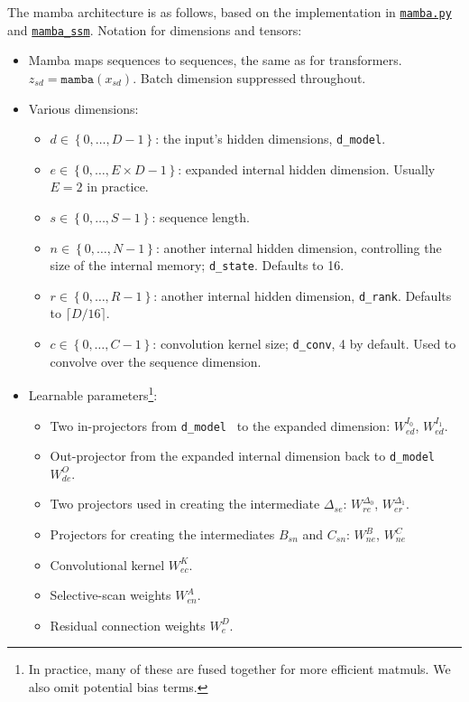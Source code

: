 The mamba architecture is as follows, based on the implementation in
\href{https://github.com/alxndrTL/mamba.py}{\texttt{mamba.py}} and
\href{https://github.com/state-spaces/mamba}{\texttt{mamba\_ssm}}.  Notation for dimensions and
tensors:
\begin{itemize}
    \item Mamba maps sequences to sequences, the same as for transformers. $ z _{ sd } =
        \texttt{mamba}\left ( x _{ sd } \right ) $. Batch dimension suppressed throughout.
    \item Various dimensions:
        \begin{itemize}
            \item $ d\in \left \{ 0, \ldots , D-1 \right \} $: the input's hidden dimensions,
                \texttt{d\_model}.
            \item $ e\in \left \{ 0, \ldots , E\times D-1 \right \} $: expanded internal hidden
                dimension. Usually $ E=2 $ in practice.
            \item $ s\in \left \{ 0, \ldots , S-1 \right \} $: sequence length.
            \item $ n\in \left \{ 0, \ldots , N-1 \right \} $: another internal hidden dimension,
                controlling the size of the internal memory; \texttt{d\_state}. Defaults to 16.
            \item $ r\in \left \{ 0, \ldots , R-1 \right \} $: another internal hidden dimension,
                \texttt{d\_rank}. Defaults to $ \lceil D /16 \rceil $.
            \item $ c\in \left \{ 0, \ldots , C-1 \right \} $: convolution kernel size;
                \texttt{d\_conv}, 4 by default. Used to convolve over the sequence dimension.
        \end{itemize}
    \item Learnable parameters\footnote{In practice, many of these are fused together for more
        efficient matmuls. We also omit potential bias terms.}:
        \begin{itemize}
            \item Two in-projectors from \texttt{d\_model } to the expanded dimension: $ W ^{ I _{ 0 } } _{ ed } $, $ W ^{ I _{ 1 } } _{ ed } $.
            \item Out-projector from the expanded internal dimension back to \texttt{d\_model } $ W ^{ O } _{ de } $.
            \item Two projectors used in creating the intermediate $ \Delta _{ se } $: $ W ^{ \Delta _{ 0 } }_{ re } $, $ W ^{ \Delta _{ 1 } }_{ er } $.
            \item Projectors for creating the intermediates $ B _{ sn } $ and $ C _{ sn } $: $ W ^{
                B } _{ ne } $, $ W ^{ C } _{ ne } $
            \item Convolutional kernel $ W ^{ K }_{ ec } $.
            \item Selective-scan weights $ W ^{ A } _{ en } $.
            \item Residual connection weights $ W ^{ D } _{ e } $.
        \end{itemize}
\end{itemize}
